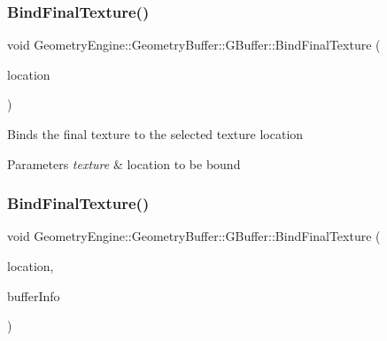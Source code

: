 \subsubsection{\texorpdfstring{BindFinalTexture()}{BindFinalTexture()}\hspace{0.1cm}{\footnotesize\ttfamily [1/2]}}
{\footnotesize\ttfamily void Geometry\+Engine\+::\+Geometry\+Buffer\+::\+G\+Buffer\+::\+Bind\+Final\+Texture (\begin{DoxyParamCaption}\item[{\mbox{\hyperlink{class_geometry_engine_1_1_geometry_buffer_1_1_g_buffer_a718dceafcac1915f7de061108597e1cc}{G\+B\+U\+F\+F\+E\+R\+\_\+\+T\+E\+X\+T\+U\+R\+E\+\_\+\+T\+Y\+PE}}}]{location }\end{DoxyParamCaption})}

Binds the final texture to the selected texture location 
\begin{DoxyParams}{Parameters}
{\em texture} & location to be bound \\
\hline
\end{DoxyParams}
\mbox{\label{class_geometry_engine_1_1_geometry_buffer_1_1_g_buffer_a710627a05fa69f6aa98ee6d90ab57e85}} 
\subsubsection{\texorpdfstring{BindFinalTexture()}{BindFinalTexture()}\hspace{0.1cm}{\footnotesize\ttfamily [2/2]}}
{\footnotesize\ttfamily void Geometry\+Engine\+::\+Geometry\+Buffer\+::\+G\+Buffer\+::\+Bind\+Final\+Texture (\begin{DoxyParamCaption}\item[{\mbox{\hyperlink{class_geometry_engine_1_1_geometry_buffer_1_1_g_buffer_a718dceafcac1915f7de061108597e1cc}{G\+B\+U\+F\+F\+E\+R\+\_\+\+T\+E\+X\+T\+U\+R\+E\+\_\+\+T\+Y\+PE}}}]{location,  }\item[{\mbox{\hyperlink{class_geometry_engine_1_1_g_buffer_texture_info}{G\+Buffer\+Texture\+Info}} \&}]{buffer\+Info }\end{DoxyParamCaption})}

